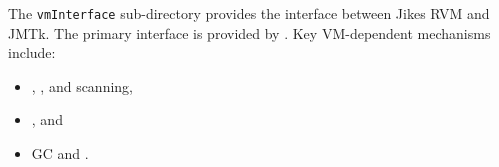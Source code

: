 The \texttt{vmInterface} sub-directory provides the interface between
Jikes RVM and JMTk.  The primary interface is provided by
.  Key
VM-dependent mechanisms include:

\begin{itemize}
\item {},
  , and
   scanning,
\item {}, and
\item GC  and .
\end{itemize}

